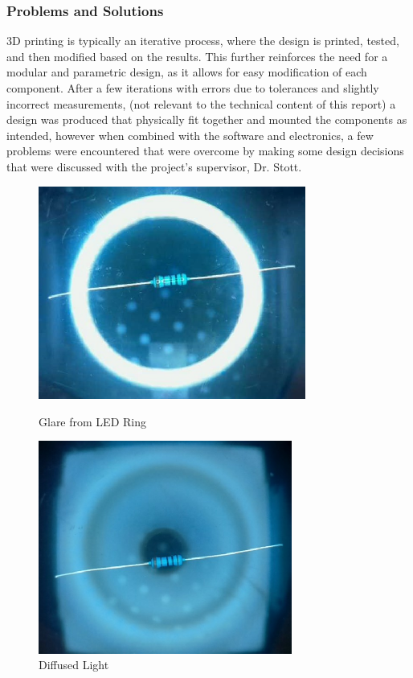 \subsubsection{Problems and Solutions}
3D printing is typically an iterative process, where the design is printed, tested, and then modified based on the results. This further reinforces the need for a modular and parametric design, as it allows for easy modification of each component. After a few iterations with errors due to tolerances and slightly incorrect measurements, (not relevant to the technical content of this report)
a design was produced that physically fit together and mounted the components as intended, however when combined with the software and electronics, a few problems were encountered that were overcome by making some design decisions that were discussed with the project's supervisor, Dr. Stott. \\

\begin{figure}
    \begin{minipage}[t]{0.49\textwidth}
        \centering
        \includegraphics[width=\textwidth,height=7cm, keepaspectratio]{imgs/design/ringlight.jpg}
        \caption{Glare from LED Ring}
        \label{fig:glare}
    \end{minipage}
    \hfill
    \begin{minipage}[t]{0.49\textwidth}
        \centering
        \includegraphics[width=\textwidth,height=7cm, keepaspectratio]{imgs/design/diffusedlight.jpg}
        \caption{Diffused Light}
        \label{fig:diffusedlight}
    \end{minipage}
\end{figure}

